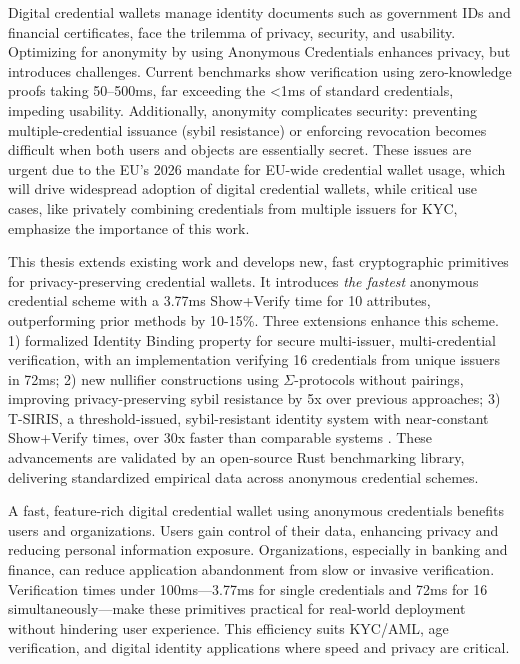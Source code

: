 
Digital credential wallets manage identity documents such as government IDs and financial certificates, face the trilemma of privacy, security, and usability. Optimizing for anonymity by using Anonymous Credentials enhances privacy, but introduces challenges. Current benchmarks show verification using zero-knowledge proofs taking 50–500ms, far exceeding the <1ms of standard credentials, impeding usability. Additionally, anonymity complicates security: preventing multiple-credential issuance (sybil resistance) or enforcing revocation becomes difficult when both users and objects are essentially secret. These issues are urgent due to the EU’s 2026 mandate for EU-wide credential wallet usage, which will drive widespread adoption of digital credential wallets, while critical use cases, like privately combining credentials from multiple issuers for KYC, emphasize the importance of this work.

This thesis extends existing work and develops new, fast cryptographic primitives for privacy-preserving credential wallets. It introduces \emph{the fastest} anonymous credential scheme with a 3.77ms Show+Verify time for 10 attributes, outperforming prior methods by 10-15\%. Three extensions enhance this scheme. 1) formalized Identity Binding property for secure multi-issuer, multi-credential verification, with an implementation verifying 16 credentials from unique issuers in 72ms; 2) new nullifier constructions using $\Sigma$-protocols without pairings, improving privacy-preserving sybil resistance by 5x over previous approaches; 3) T-SIRIS, a threshold-issued, sybil-resistant identity system with near-constant Show+Verify times, over 30x faster than comparable systems \cite{rabaninejad_attribute-based_2024}.
These advancements are validated by an open-source Rust benchmarking library, delivering standardized empirical data across anonymous credential schemes.

A fast, feature-rich digital credential wallet using anonymous credentials benefits users and organizations. Users gain control of their data, enhancing privacy and reducing personal information exposure. Organizations, especially in banking and finance, can reduce application abandonment from slow or invasive verification. Verification times under 100ms—3.77ms for single credentials and 72ms for 16 simultaneously—make these primitives practical for real-world deployment without hindering user experience. This efficiency suits KYC/AML, age verification, and digital identity applications where speed and privacy are critical.